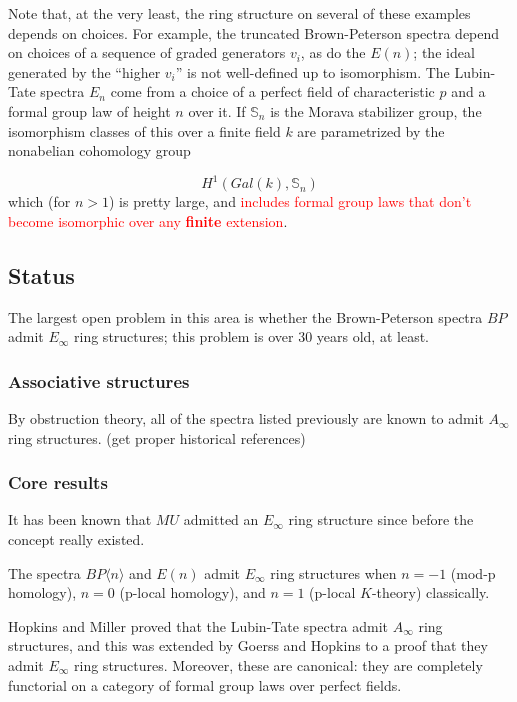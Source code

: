 \documentclass[12pt,titlepage]{article}
\newcommand{\gt}{>}
\newcommand{\rd}[1]{{\textcolor{red}{#1}}}
\theoremstyle{plain}
\theoremstyle{definition}
\theoremstyle{remark}
\begin{document}
Note that, at the very least, the ring structure on several of these examples depends on choices. For example, the truncated Brown-Peterson spectra depend on choices of a sequence of graded generators $v_i$, as do the $E(n)$; the ideal generated by the ``{}higher $v_i$''{} is not well-defined up to isomorphism. The Lubin-Tate spectra $E_n$ come from a choice of a perfect field of characteristic $p$ and a formal group law of height $n$ over it. If $\mathbb{S}_n$ is the Morava stabilizer group, the isomorphism classes of this over a finite field $k$ are parametrized by the nonabelian cohomology group

\begin{displaymath}
H^1(Gal(k), \mathbb{S}_n)
\end{displaymath}
which (for $n \gt 1$) is pretty large, and \rd{includes formal group laws that don'{}t become isomorphic over any \textbf{finite} extension}.

\hypertarget{status_4}{}\subsection{{Status}}\label{status_4}

The largest open problem in this area is whether the Brown-Peterson spectra $BP$ admit $E_\infty$ ring structures; this problem is over 30 years old, at least.

\hypertarget{associative_structures_5}{}\subsubsection{{Associative structures}}\label{associative_structures_5}

By obstruction theory, all of the spectra listed previously are known to admit $A_\infty$ ring structures. (get proper historical references)

\hypertarget{core_results_6}{}\subsubsection{{Core results}}\label{core_results_6}

It has been known that $MU$ admitted an $E_\infty$ ring structure since before the concept really existed.

The spectra $BP\langle n\rangle$ and $E(n)$ admit $E_\infty$ ring structures when $n=-1$ (mod-p homology), $n=0$ (p-local homology), and $n=1$ (p-local $K$-theory) classically.

Hopkins and Miller proved that the Lubin-Tate spectra admit $A_\infty$ ring structures, and this was extended by Goerss and Hopkins to a proof that they admit $E_\infty$ ring structures. Moreover, these are canonical: they are completely functorial on a category of formal group laws over perfect fields.
\end{document}
